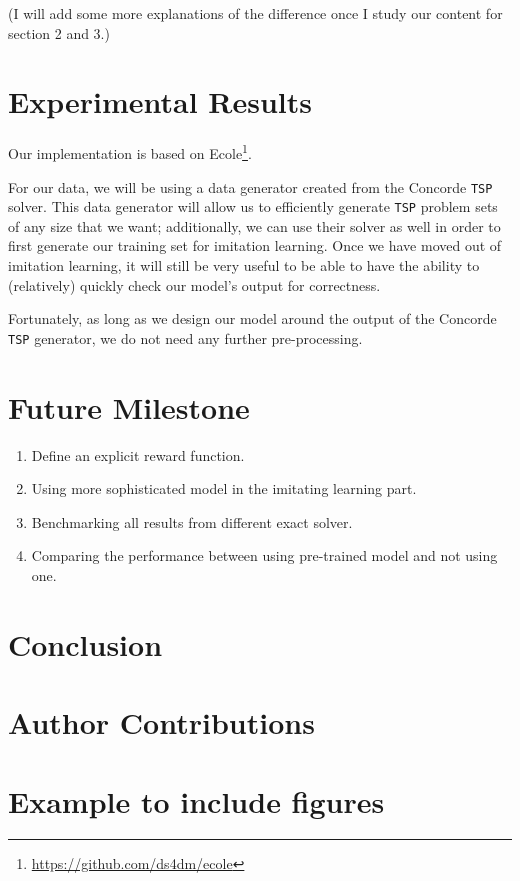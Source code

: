 \documentclass{article}
\newcommand{\incfig}[1]{%
	\def\svgwidth{\columnwidth}
	{#1.pdf_tex}
}
\begin{document}
(I will add some more explanations of the difference once I study our content for section 2 and 3.)




\section{Experimental Results}
Our implementation is based on Ecole\footnote{\url{https://github.com/ds4dm/ecole}}.

For our data, we will be using a data generator created from the Concorde \texttt{TSP} solver. This data generator will allow us to efficiently generate \texttt{TSP} problem sets of any size that we want; additionally, we can use their solver as well in order to first generate our training set for imitation learning. Once we have moved out of imitation learning, it will still be very useful to be able to have the ability to (relatively) quickly check our model's output for correctness.

Fortunately, as long as we design our model around the output of the Concorde \texttt{TSP} generator, we do not need any further pre-processing.

\section{Future Milestone}
\begin{enumerate}
	\item Define an explicit reward function.
	\item Using more sophisticated model in the imitating learning part.
	\item Benchmarking all results from different exact solver.
	\item Comparing the performance between using pre-trained model and not using one.
\end{enumerate}

\section{Conclusion}

\section*{Author Contributions}


\section{Example to include figures}
\begin{figure}[H]
	\centering
\end{figure}




\end{document}
